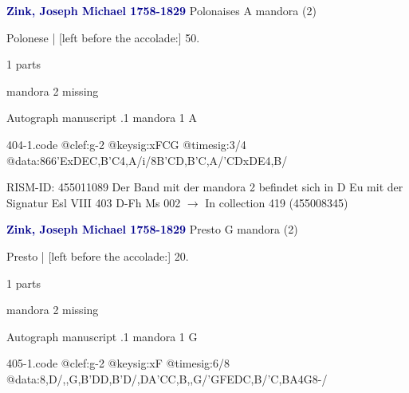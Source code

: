 \documentclass[twocolumn]{book}
\begin{document}
\newline \par \vspace{7pt} \textcolor{darkblue}{\textbf{Zink, Joseph Michael  1758-1829}}
\newline Polonaises  A  
\newline mandora (2)
\newline \begin{itshape}[f.26v, at left:] Polonese | [left before the accolade:] 50.\end{itshape} 
\newline \textcolor{darkblue}{}  1 parts  
\newline \begin{small} mandora 2 missing\end{small} 
\newline Autograph manuscript
.1  mandora 1  A  
\begin{filecontents*}{404-1.code}
@clef:g-2
@keysig:xFCG
@timesig:3/4
@data:{866'ExDE}{C,B'C}4,A/i/8{B'C}{D,B}{'C,A}/{'CD}{xDE}4,B/
\end{filecontents*}
\newline
%

\newline RISM-ID: 455011089
\newline Der Band mit der mandora 2 befindet sich in D Eu mit der Signatur Esl VIII 403
\newline D-Fh  Ms 002
\newline $\rightarrow$ In collection 419 (455008345)

\newline \par \vspace{7pt} \textcolor{darkblue}{\textbf{Zink, Joseph Michael  1758-1829}}
\newline Presto  G  
\newline mandora (2)
\newline \begin{itshape}[f.14r, at left:] Presto | [left before the accolade:] 20.\end{itshape} 
\newline \textcolor{darkblue}{}  1 parts  
\newline \begin{small} mandora 2 missing\end{small} 
\newline Autograph manuscript
.1  mandora 1  G  
\begin{filecontents*}{405-1.code}
@clef:g-2
@keysig:xF
@timesig:6/8
@data:8,D/,,G,B'DD,B'D/,DA'CC,B,,G/{'GFE}{DC,B}/'C,BA4G8-/
\end{filecontents*}
\newline
%
\end{document}
